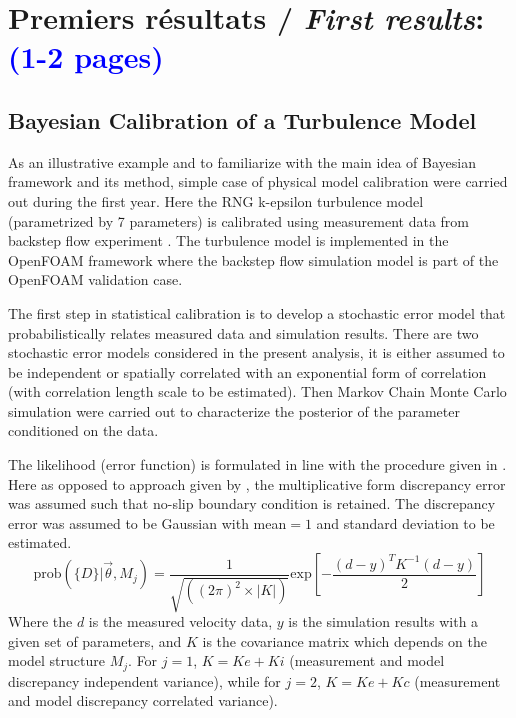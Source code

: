 \documentclass[11pt,titlepage]{article}
\begin{document}
\newpage
\section{Premiers résultats /  {\large\textit{First results}}: \textcolor{blue}{(1-2 pages)}}


\subsection{Bayesian Calibration of a Turbulence Model}

As an illustrative example and to familiarize with the main idea of Bayesian framework and its method, simple case of physical model calibration were carried out during the first year. 
Here the RNG k-epsilon turbulence model (parametrized by 7 parameters) is calibrated using measurement data from backstep flow experiment \cite{Kasagi1995}. 
The turbulence model is implemented in the OpenFOAM framework where the backstep flow simulation model is part of the OpenFOAM validation case.

The first step in statistical calibration is to develop a stochastic error model that probabilistically relates measured data and simulation results. 
There are two stochastic error models considered in the present analysis, it is either assumed to be independent or spatially correlated with an exponential form of correlation (with correlation length scale to be estimated). 
Then Markov Chain Monte Carlo simulation were carried out to characterize the posterior of the parameter conditioned on the data.

The likelihood (error function) is formulated in line with the procedure given in \cite{Cheung2011}. 
Here as opposed to approach given by \cite{KennedyOHagan2001}, the multiplicative form discrepancy error was assumed such that no-slip boundary condition is retained. 
The discrepancy error was assumed to be Gaussian with mean$=1$ and standard deviation to be estimated.
\begin{equation}
\text{prob}(\{D\} | \vec{\theta}, M_j) = \frac{1}{\sqrt{((2\pi)^2 \times|K|)}} \text{exp} \left[ - \frac{(d-y)^T K^{-1} (d-y)}{2} \right]
\end{equation}
Where the $d$ is the measured velocity data, $y$ is the simulation results with a given set of parameters, and $K$ is the covariance matrix which depends on the model structure $M_j$. 
For $j=1$, $K = Ke + Ki$ (measurement and model discrepancy independent variance), while for $j=2$, $K = Ke + Kc$ (measurement and model discrepancy correlated variance).
\end{document}
